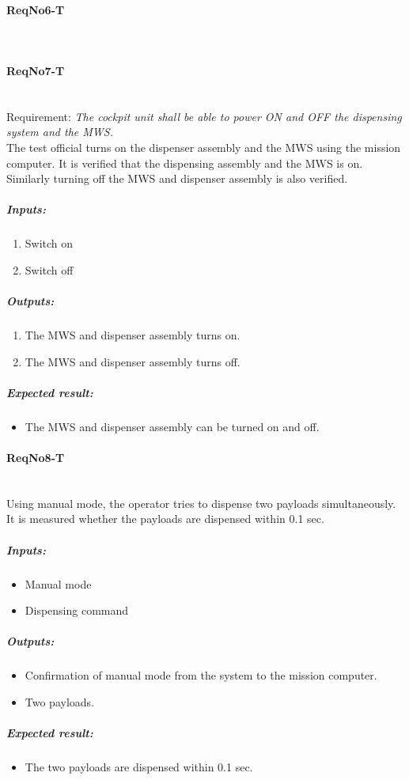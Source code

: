 \paragraph{ReqNo6-T}\mbox{}\\ %

\paragraph{ReqNo7-T}\mbox{}\\ %
Requirement: \textit{The cockpit unit shall be able to power ON and OFF the dispensing system and the MWS.}
\\
The test official turns on the dispenser assembly and the MWS using the mission computer. It is verified that the dispensing assembly and the MWS is on. Similarly turning off the MWS and dispenser assembly is also verified.

\subparagraph{Inputs:}
	\begin{enumerate}
	\item Switch on
	\item Switch off
	\end{enumerate}
	\subparagraph{Outputs:}
	\begin{enumerate}
	\item The MWS and dispenser assembly turns on.
	\item The MWS and dispenser assembly turns off.
	\end{enumerate}
	\subparagraph{Expected result:}
	\begin{itemize}
	\item The MWS and dispenser assembly can be turned on and off.
	\end{itemize}


\paragraph{ReqNo8-T}\mbox{}\\ %
Using manual mode, the operator tries to dispense two payloads simultaneously. It is measured whether the payloads are dispensed within 0.1 sec.
\\
	\subparagraph{Inputs:}
	\begin{itemize}
	\item Manual mode
	\item Dispensing command
	\end{itemize}
	\subparagraph{Outputs:}
	\begin{itemize}
	\item Confirmation of manual mode from the system to the mission computer.
	\item Two payloads.
	\end{itemize}
	\subparagraph{Expected result:}
	\begin{itemize}
	\item The two payloads are dispensed within 0.1 sec.
	\end{itemize}

